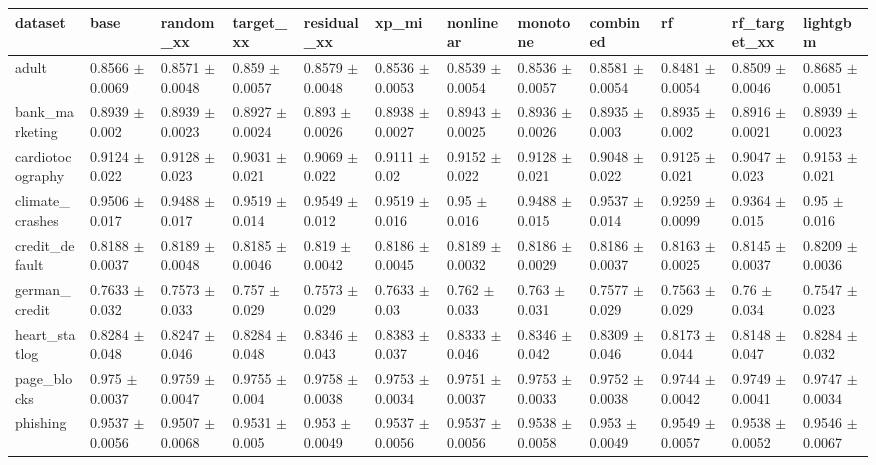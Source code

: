 \begin{tabular}{llllllllllll}
\toprule
dataset & base & random\_xx & target\_xx & residual\_xx & xp\_mi & nonlinear & monotone & combined & rf & rf\_target\_xx & lightgbm \\
\midrule
adult & 0.8566 $\pm$ 0.0069 & 0.8571 $\pm$ 0.0048 & 0.859 $\pm$ 0.0057 & 0.8579 $\pm$ 0.0048 & 0.8536 $\pm$ 0.0053 & 0.8539 $\pm$ 0.0054 & 0.8536 $\pm$ 0.0057 & 0.8581 $\pm$ 0.0054 & 0.8481 $\pm$ 0.0054 & 0.8509 $\pm$ 0.0046 & 0.8685 $\pm$ 0.0051 \\
bank\_marketing & 0.8939 $\pm$ 0.002 & 0.8939 $\pm$ 0.0023 & 0.8927 $\pm$ 0.0024 & 0.893 $\pm$ 0.0026 & 0.8938 $\pm$ 0.0027 & 0.8943 $\pm$ 0.0025 & 0.8936 $\pm$ 0.0026 & 0.8935 $\pm$ 0.003 & 0.8935 $\pm$ 0.002 & 0.8916 $\pm$ 0.0021 & 0.8939 $\pm$ 0.0023 \\
cardiotocography & 0.9124 $\pm$ 0.022 & 0.9128 $\pm$ 0.023 & 0.9031 $\pm$ 0.021 & 0.9069 $\pm$ 0.022 & 0.9111 $\pm$ 0.02 & 0.9152 $\pm$ 0.022 & 0.9128 $\pm$ 0.021 & 0.9048 $\pm$ 0.022 & 0.9125 $\pm$ 0.021 & 0.9047 $\pm$ 0.023 & 0.9153 $\pm$ 0.021 \\
climate\_crashes & 0.9506 $\pm$ 0.017 & 0.9488 $\pm$ 0.017 & 0.9519 $\pm$ 0.014 & 0.9549 $\pm$ 0.012 & 0.9519 $\pm$ 0.016 & 0.95 $\pm$ 0.016 & 0.9488 $\pm$ 0.015 & 0.9537 $\pm$ 0.014 & 0.9259 $\pm$ 0.0099 & 0.9364 $\pm$ 0.015 & 0.95 $\pm$ 0.016 \\
credit\_default & 0.8188 $\pm$ 0.0037 & 0.8189 $\pm$ 0.0048 & 0.8185 $\pm$ 0.0046 & 0.819 $\pm$ 0.0042 & 0.8186 $\pm$ 0.0045 & 0.8189 $\pm$ 0.0032 & 0.8186 $\pm$ 0.0029 & 0.8186 $\pm$ 0.0037 & 0.8163 $\pm$ 0.0025 & 0.8145 $\pm$ 0.0037 & 0.8209 $\pm$ 0.0036 \\
german\_credit & 0.7633 $\pm$ 0.032 & 0.7573 $\pm$ 0.033 & 0.757 $\pm$ 0.029 & 0.7573 $\pm$ 0.029 & 0.7633 $\pm$ 0.03 & 0.762 $\pm$ 0.033 & 0.763 $\pm$ 0.031 & 0.7577 $\pm$ 0.029 & 0.7563 $\pm$ 0.029 & 0.76 $\pm$ 0.034 & 0.7547 $\pm$ 0.023 \\
heart\_statlog & 0.8284 $\pm$ 0.048 & 0.8247 $\pm$ 0.046 & 0.8284 $\pm$ 0.048 & 0.8346 $\pm$ 0.043 & 0.8383 $\pm$ 0.037 & 0.8333 $\pm$ 0.046 & 0.8346 $\pm$ 0.042 & 0.8309 $\pm$ 0.046 & 0.8173 $\pm$ 0.044 & 0.8148 $\pm$ 0.047 & 0.8284 $\pm$ 0.032 \\
page\_blocks & 0.975 $\pm$ 0.0037 & 0.9759 $\pm$ 0.0047 & 0.9755 $\pm$ 0.004 & 0.9758 $\pm$ 0.0038 & 0.9753 $\pm$ 0.0034 & 0.9751 $\pm$ 0.0037 & 0.9753 $\pm$ 0.0033 & 0.9752 $\pm$ 0.0038 & 0.9744 $\pm$ 0.0042 & 0.9749 $\pm$ 0.0041 & 0.9747 $\pm$ 0.0034 \\
phishing & 0.9537 $\pm$ 0.0056 & 0.9507 $\pm$ 0.0068 & 0.9531 $\pm$ 0.005 & 0.953 $\pm$ 0.0049 & 0.9537 $\pm$ 0.0056 & 0.9537 $\pm$ 0.0056 & 0.9538 $\pm$ 0.0058 & 0.953 $\pm$ 0.0049 & 0.9549 $\pm$ 0.0057 & 0.9538 $\pm$ 0.0052 & 0.9546 $\pm$ 0.0067 \\

\end{tabular}
